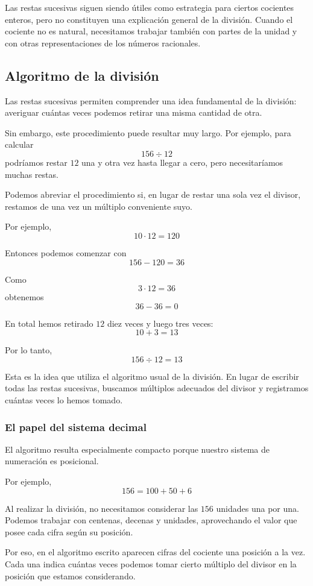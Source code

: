 Las restas sucesivas siguen siendo útiles como estrategia para ciertos cocientes enteros, pero no constituyen una explicación general de la división. Cuando el cociente no es natural, necesitamos trabajar también con partes de la unidad y con otras representaciones de los números racionales.

\subsection{Algoritmo de la división}

Las restas sucesivas permiten comprender una idea fundamental de la división: averiguar cuántas veces podemos retirar una misma cantidad de otra.

Sin embargo, este procedimiento puede resultar muy largo. Por ejemplo, para calcular
\[
156\div12
\]
podríamos restar \(12\) una y otra vez hasta llegar a cero, pero necesitaríamos muchas restas.

Podemos abreviar el procedimiento si, en lugar de restar una sola vez el divisor, restamos de una vez un múltiplo conveniente suyo.

Por ejemplo,
\[
10\cdot12=120
\]

Entonces podemos comenzar con
\[
156-120=36
\]

Como
\[
3\cdot12=36
\]
obtenemos
\[
36-36=0
\]

En total hemos retirado \(12\) diez veces y luego tres veces:
\[
10+3=13
\]

Por lo tanto,
\[
156\div12=13
\]

Esta es la idea que utiliza el algoritmo usual de la división. En lugar de escribir todas las restas sucesivas, buscamos múltiplos adecuados del divisor y registramos cuántas veces lo hemos tomado.

\subsubsection{El papel del sistema decimal}

El algoritmo resulta especialmente compacto porque nuestro sistema de numeración es posicional.

Por ejemplo,
\[
156=100+50+6
\]

Al realizar la división, no necesitamos considerar las \(156\) unidades una por una. Podemos trabajar con centenas, decenas y unidades, aprovechando el valor que posee cada cifra según su posición.

Por eso, en el algoritmo escrito aparecen cifras del cociente una posición a la vez. Cada una indica cuántas veces podemos tomar cierto múltiplo del divisor en la posición que estamos considerando.

